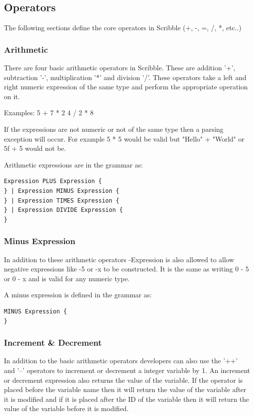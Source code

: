 \documentclass[]{final_report}
\begin{document}
\subsection{Operators}

The following sections define the core operators in Scribble (+, -, =, /, *, etc..)

\subsubsection{Arithmetic}

There are four basic arithmetic operators in Scribble. These are addition '+', subtraction '-', multiplication '*' and division '/'. These operators take a left and right numeric expression of the same type and perform the appropriate operation on it.

Examples: 
5 + 7 * 2
4 / 2 * 8

If the expressions are not numeric or not of the same type then a parsing exception will occur. For example 5 * 5 would be valid but "Hello" + "World" or 5f + 5 would not be.

Arithmetic expressions are in the grammar as:
\begin{verbatim}
Expression PLUS Expression {
} | Expression MINUS Expression {
} | Expression TIMES Expression {
} | Expression DIVIDE Expression {
}
\end{verbatim}

\subsubsection{Minus Expression}

In addition to these arithmetic operators -Expression is also allowed to allow negative expressions like -5 or -x to be constructed. It is the same as writing 0 - 5 or 0 - x and is valid for any numeric type. 

A minus expression is defined in the grammar as:

\begin{verbatim}
MINUS Expression {
}
\end{verbatim}

\subsubsection{Increment \& Decrement}

In addition to the basic arithmetic operators developers can also use the '++' and '--' operators to increment or decrement a integer variable by 1. An increment or decrement expression also returns the value of the variable. If the operator is placed before the variable name then it will return the value of the variable after it is modified and if it is placed after the ID of the variable then it will return the value of the variable before it is modified.
\end{document}
